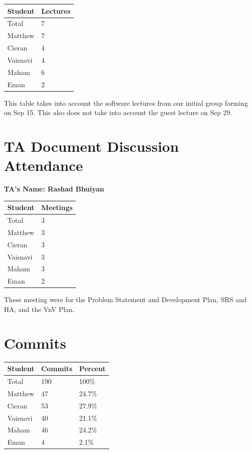 \documentclass{article}
\begin{document}
\begin{table}[H]
\centering
\begin{tabular}{ll}
\toprule
\textbf{Student} & \textbf{Lectures}\\
\midrule
Total & 7\\
Matthew & 7\\
Cieran & 4\\
Vaisnavi & 4\\
Maham & 6\\
Eman & 2\\
\bottomrule
\end{tabular}
\end{table}

\noindent This table takes into account the software lectures from our initial group forming on Sep 15. This also does not take into account the guest lecture on Sep 29.

\section{TA Document Discussion Attendance}


\noindent \textbf{TA's Name: Rashad Bhuiyan}

\begin{table}[H]
\centering
\begin{tabular}{ll}
\toprule
\textbf{Student} & \textbf{Meetings}\\
\midrule
Total & 3\\
Matthew & 3\\
Cieran & 3\\
Vaisnavi & 3\\
Maham & 3\\
Eman & 2\\
\bottomrule
\end{tabular}
\end{table}

\noindent These meeting were for the Problem Statement and Development Plan, SRS and HA, and the VnV Plan.

\section{Commits}


\begin{table}[H]
\centering
\begin{tabular}{lll}
\toprule
\textbf{Student} & \textbf{Commits} & \textbf{Percent}\\
\midrule
Total & 190 & 100\% \\
Matthew & 47 & 24.7\% \\
Cieran & 53 & 27.9\% \\
Vaisnavi & 40 & 21.1\% \\
Maham & 46 & 24.2\% \\
Eman & 4 & 2.1\% \\
\bottomrule
\end{tabular}
\end{table}
\end{document}
